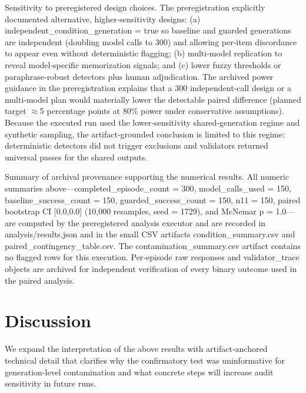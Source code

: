 \documentclass[conference]{IEEEtran}
\begin{document}
Sensitivity to preregistered design choices. The preregistration explicitly documented alternative, higher‑sensitivity designs: (a) independent\_condition\_generation = true so baseline and guarded generations are independent (doubling model calls to 300) and allowing per‑item discordance to appear even without deterministic flagging; (b) multi‑model replication to reveal model‑specific memorization signals; and (c) lower fuzzy thresholds or paraphrase‑robust detectors plus human adjudication. The archived power guidance in the preregistration explains that a 300 independent‑call design or a multi‑model plan would materially lower the detectable paired difference (planned target \ensuremath{\approx}5 percentage points at 80\% power under conservative assumptions). Because the executed run used the lower‑sensitivity shared‑generation regime and synthetic sampling, the artifact‑grounded conclusion is limited to this regime: deterministic detectors did not trigger exclusions and validators returned universal passes for the shared outputs.

Summary of archival provenance supporting the numerical results. All numeric summaries above---completed\_episode\_count = 300, model\_calls\_used = 150, baseline\_success\_count = 150, guarded\_success\_count = 150, n11 = 150, paired bootstrap CI [0.0,0.0] (10,000 resamples, seed = 1729), and McNemar p = 1.0---are computed by the preregistered analysis executor and are recorded in analysis/results.json and in the small CSV artifacts condition\_summary.csv and paired\_contingency\_table.csv. The contamination\_summary.csv artifact contains no flagged rows for this execution. Per‑episode raw responses and validator\_trace objects are archived for independent verification of every binary outcome used in the paired analysis.

\section{Discussion}
We expand the interpretation of the above results with artifact‑anchored technical detail that clarifies why the confirmatory test was uninformative for generation‑level contamination and what concrete steps will increase audit sensitivity in future runs.
\end{document}

